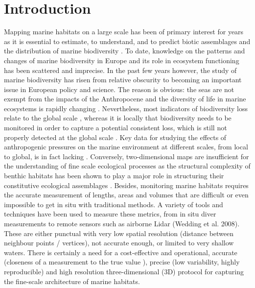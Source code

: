 \section[Introduction]{Introduction}\label{chapitre1_1}
Mapping marine habitats on a large scale has been of primary interest for years as it is essential to estimate, to understand, and to predict biotic assemblages and the distribution of marine biodiversity \citep{tittensor_mid-term_2014}. To date, knowledge on the patterns and changes of marine biodiversity in Europe and its role in ecosystem functioning has been scattered and imprecise. In the past few years however, the study of marine biodiversity has risen from relative obscurity to becoming an important issue in European policy and science. The reason is obvious: the seas are not exempt from the impacts of the Anthropocene and the diversity of life in marine ecosystems is rapidly changing \citep{mcgill_fifteen_2015}. Nevertheless, most indicators of biodiversity loss relate to the global scale \citep{pimm_biodiversity_2014}, whereas it is locally that biodiversity needs to be monitored in order to capture a potential consistent loss, which is still not properly detected at the global scale \citep{dornelas_assemblage_2014}. Key data for studying the effects of anthropogenic pressures on the marine environment at different scales, from local to global, is in fact lacking \citep{halpern_global_2008}. Conversely, two-dimensional maps are insufficient for the understanding of fine scale ecological processes as the structural complexity of benthic habitats has been shown to play a major role in structuring their constitutive ecological assemblages \citep{agudo-adriani_colony_2016, darling_relationships_2017, friedlander_designing_2003, graham_importance_2013, kovalenko_habitat_2012}. Besides, monitoring marine habitats requires the accurate measurement of lengths, areas and volumes that are difficult or even impossible to get in situ with traditional methods. A variety of tools and techniques have been used to measure these metrics, from in situ diver measurements \citep{dustan_digital_2013} to remote sensors such as airborne Lidar (Wedding et al. 2008). These are either punctual with very low spatial resolution (distance between neighbour points / vertices), not accurate enough, or limited to very shallow waters. There is certainly a need for a cost-effective and operational, accurate (closeness of a measurement to the true value \citep{granshaw_photogrammetric_2016}), precise (low variability, highly reproducible) and high resolution three-dimensional (3D) protocol for capturing the fine-scale architecture of marine habitats.
